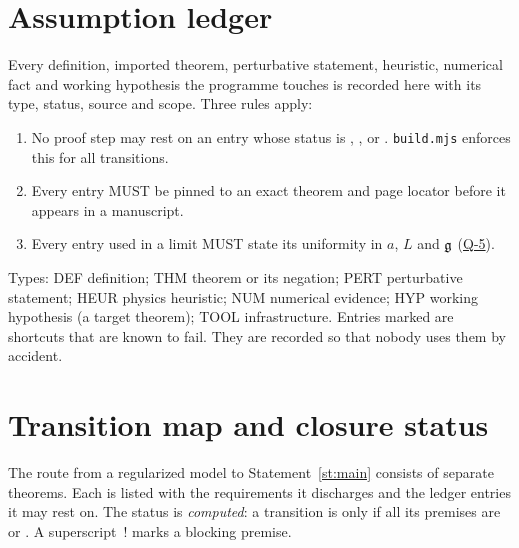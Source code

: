 \documentclass[11pt,a4paper]{article}
\newcommand{\idref}[1]{\hyperref[#1]{\textsf{#1}}}
\begin{document}
\section{Assumption ledger}\label{sec:ledger}

Every definition, imported theorem, perturbative statement, heuristic, numerical fact and working hypothesis the programme touches is recorded here with its type, status, source and scope. Three rules apply:
\begin{enumerate}[label=\textbf{R\arabic*}]
\item No proof step may rest on an entry whose status is , ,  or . \texttt{build.mjs} enforces this for all transitions.
\item Every  entry MUST be pinned to an exact theorem and page locator before it appears in a manuscript.
\item Every entry used in a limit MUST state its uniformity in $a$, $L$ and $\mathfrak g$ (\idref{Q-5}).
\end{enumerate}
Types: \textsf{DEF} definition; \textsf{THM} theorem or its negation; \textsf{PERT} perturbative statement; \textsf{HEUR} physics heuristic; \textsf{NUM} numerical evidence; \textsf{HYP} working hypothesis (a target theorem); \textsf{TOOL} infrastructure.
Entries marked  are shortcuts that are known to fail. They are recorded so that nobody uses them by accident.

{\small}

\section{Transition map and closure status}\label{sec:transitions}

The route from a regularized model to Statement~\ref{st:main} consists of separate theorems. Each is listed with the requirements it discharges and the ledger entries it may rest on. The status is \emph{computed}: a transition is  only if all its premises are  or . A superscript~! marks a blocking premise.
\end{document}
